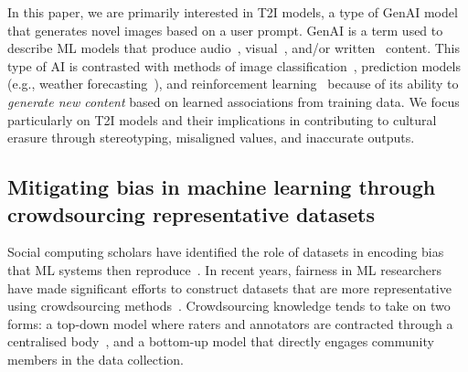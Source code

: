 In this paper, we are primarily interested in T2I models, a type of GenAI model that generates novel images based on a user prompt. GenAI is a term used to describe ML models that produce audio~\cite{borsos2023audiolm, kreuk2022audiogen}, visual~\cite{hu2024instructimagen, reed2016generativedalle}, and/or written~\cite{tonja2024inkubalm, achiam2023gpt, team2023gemini} content. This type of AI is contrasted with methods of image classification~\cite{deng2009imagenet, lin2014microsoftcoco}, prediction models (e.g., weather forecasting~\cite{lam2023weatherforecasting}), and reinforcement learning~\cite{sutton2018reinforcement} because of its ability to \textit{generate new content} based on learned associations from training data. We focus particularly on T2I models and their implications in contributing to cultural erasure through stereotyping, misaligned values, and inaccurate outputs.

\subsection{Mitigating bias in machine learning through crowdsourcing representative datasets}
Social computing scholars have identified the role of datasets in encoding bias that ML systems then reproduce~\cite{gebru2021datasheets,buolamwiniGenderShades,sweeney2013discrimination,scheuermanDatasetsHavePolitics2021,scheuermanProductsPositionalityHow2024,kapaniaHuntSnarkAnnotator2023,sambasivan2021everyone}. In recent years, fairness in ML researchers have made significant efforts to construct datasets that are more representative using crowdsourcing methods~\cite{singh2024aya_dataset,romero2024cvqa}. Crowdsourcing knowledge tends to take on two forms: a top-down model where raters and annotators are contracted through a centralised body~\cite{miceli2020between}, and a bottom-up model that directly engages community members in the data collection. 

